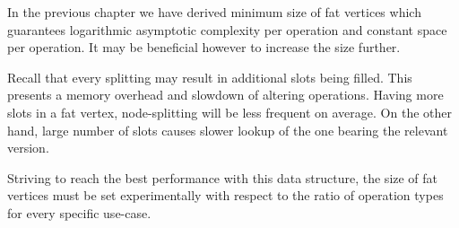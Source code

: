 In the previous chapter we have derived minimum size of fat vertices which guarantees logarithmic asymptotic complexity per operation and constant space per operation. It may be beneficial however to increase the size further.

Recall that every splitting may result in additional slots being filled. This presents a memory overhead and slowdown of altering operations. Having more slots in a fat vertex, node-splitting will be less frequent on average. On the other hand, large number of slots causes slower lookup of the one bearing the relevant version. 

Striving to reach the best performance with this data structure, the size of fat vertices must be set experimentally with respect to the ratio of operation types for every specific use-case.